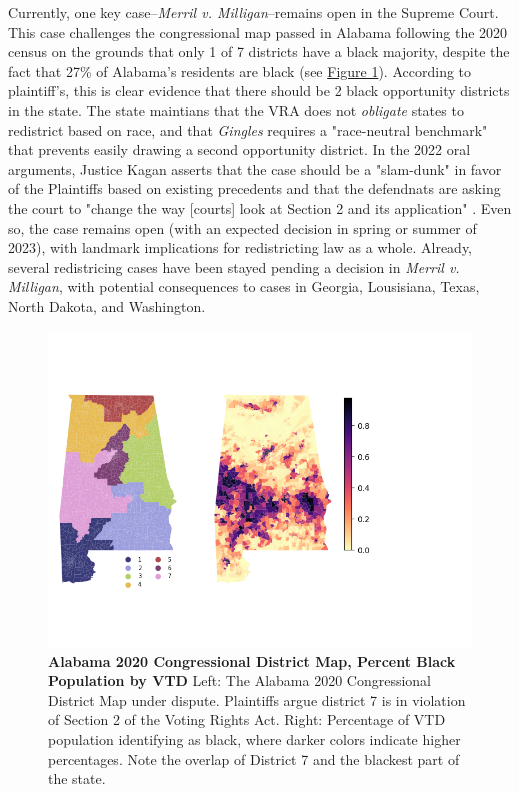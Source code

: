 \documentclass{article}
\begin{document}
\par 
Currently, one key case--\emph{Merril v. Milligan}--remains open in the Supreme Court. This case challenges the congressional map passed in Alabama following the 2020 census on the grounds that only 1 of 7 districts have a black majority, despite the fact that 27\% of Alabama's residents are black (see \hyperref[fig 1]{Figure 1}). According to plaintiff's, this is clear evidence that there should be 2 black opportunity districts in the state. The state maintians that the VRA does not \emph{obligate} states to redistrict based on race, and that \emph{Gingles} requires a "race-neutral benchmark" that prevents easily drawing a second opportunity district. In the 2022 oral arguments, Justice Kagan asserts that the case should be a "slam-dunk" in favor of the Plaintiffs based on existing precedents and that the defendnats are asking the court to "change the way [courts] look at Section 2 and its application" \cite{Merill}. Even so, the case remains open (with an expected decision in spring or summer of 2023), with landmark implications for redistricting law as a whole. Already, several redistricing cases have been stayed pending a decision in \emph{Merril v. Milligan}, with potential consequences to cases in Georgia, Lousisiana, Texas, North Dakota, and Washington.

\begin{figure}[h]\label{fig 1}
    \centering
    \includegraphics[trim={0cm 2cm 4cm 2},clip,scale=.75]{images/AL.png}
    \caption{\textbf{Alabama 2020 Congressional District Map, Percent Black Population by VTD} Left: The Alabama 2020 Congressional District Map under dispute. Plaintiffs argue district 7 is in violation of Section 2 of the Voting Rights Act. Right: Percentage of VTD population identifying as black, where darker colors indicate higher percentages. Note the overlap of District 7 and the blackest part of the state.}
\end{figure}
\end{document}
